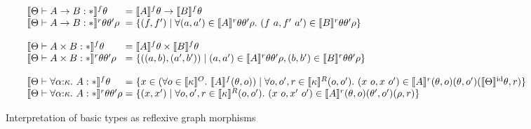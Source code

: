\documentclass[preprint]{sigplanconf}
\newcommand{\sepbar}{\mathrel|}
\theoremstyle{examplestyle}
\newcommand{\sem}[1]{\llbracket #1 \rrbracket}
\newcommand{\semKU}[1]{\llbracket #1 \rrbracket^O}
\newcommand{\semKR}[1]{\llbracket #1 \rrbracket^R}
\newcommand{\semKI}[1]{\llbracket #1 \rrbracket^{\mathrm{id}}}
\begin{document}
\begin{figure*}[t]
  \begin{displaymath}
    \begin{array}{l@{\hspace{0.3em}}c@{\hspace{0.3em}}l}
      \sem{\Theta \vdash A \to B : *}^f \theta & = & \sem{A}^f\theta \to \sem{B}^f\theta \\
      \sem{\Theta \vdash A \to B : *}^r\theta\theta'\rho & = &
      \{ (f,f') \sepbar \forall (a,a') \in \sem{A}^r\theta\theta'\rho.\ (f~a, f'~a') \in \sem{B}^r\theta\theta'\rho \} \\
      \\
      \sem{\Theta \vdash A \times B : *}^f \theta & = & \sem{A}^f\theta \times \sem{B}^f\theta \\
      \sem{\Theta \vdash A \times B : *}^r\theta\theta'\rho & = &
      \{ ((a,b),(a',b')) \sepbar (a,a') \in \sem{A}^r\theta\theta'\rho, (b,b') \in \sem{B}^r\theta\theta'\rho \} \\
      \\
      \sem{\Theta \vdash \forall \alpha\mathord:\kappa.~A : *}^f \theta &=& \{
      \begin{array}[t]{@{}l}
        x \in (\forall o \in \semKU{\kappa}.\ \sem{A}^f(\theta, o)) \sepbar
        \forall o,o',r \in \semKR{\kappa}(o,o').\ (x~o, x~o') \in \sem{A}^r(\theta,o)(\theta,o')(\semKI{\Theta} \theta, r) \}
      \end{array} \\
      \sem{\Theta \vdash \forall \alpha\mathord:\kappa.~A : *}^r\theta\theta'\rho &=& \{ (x,x') \sepbar \forall o, o', r \in \semKR{\kappa}(o,o').\ (x~o, x'~o') \in \sem{A}^r(\theta,o)(\theta',o')(\rho, r) \}
    \end{array}
  \end{displaymath}
  \caption{Interpretation of basic types as reflexive graph morphisms}
  \label{fig:basic-type-interpretation}
\end{figure*}
\end{document}

